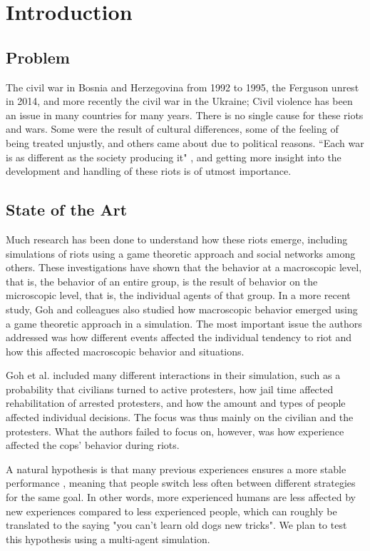 \section{Introduction}
\subsection{Problem}
The civil war in Bosnia and Herzegovina from 1992 to 1995, the Ferguson unrest in 2014, and more recently the civil war in the Ukraine; Civil violence has been an issue in many countries for many years.
There is no single cause for these riots and wars.
Some were the result of cultural differences, some of the feeling of being treated unjustly, and others came about due to political reasons.
``Each war is as different as the society producing it" \citep*{sambanis2001ethnic}, and getting more insight into the development and handling of these riots is of utmost importance.


\subsection{State of the Art}
Much research has been done to understand how these riots emerge, including simulations of riots using a game theoretic approach \citep*{myerson1991game} and social networks \citep*{gulden2002spatial} among others.
These investigations have shown that the behavior at a macroscopic level, that is, the behavior of an entire group, is the result of behavior on the microscopic level, that is, the individual agents of that group.
In a more recent study, Goh and colleagues \citep*{goh2006modeling} also studied how macroscopic behavior emerged using a game theoretic approach in a simulation.
The most important issue the authors addressed was how different events affected the individual tendency to riot and how this affected macroscopic behavior and situations.


Goh et al. included many different interactions in their simulation, such as a probability that civilians turned to active protesters, how jail time affected rehabilitation of arrested protesters, and how the amount and types of people affected individual decisions. The focus was thus mainly on the civilian and the protesters. What the authors failed to focus on, however, was how experience affected the cops' behavior during riots.

A natural hypothesis is that many previous experiences ensures a more stable performance \citep{anderson2007mind,nason2005soar}, meaning that people switch less often between different strategies for the same goal. In other words, more experienced humans are less affected by new experiences compared to less experienced people, which can roughly be translated to the saying "you can't learn old dogs new tricks". We plan to test this hypothesis using a multi-agent simulation.

